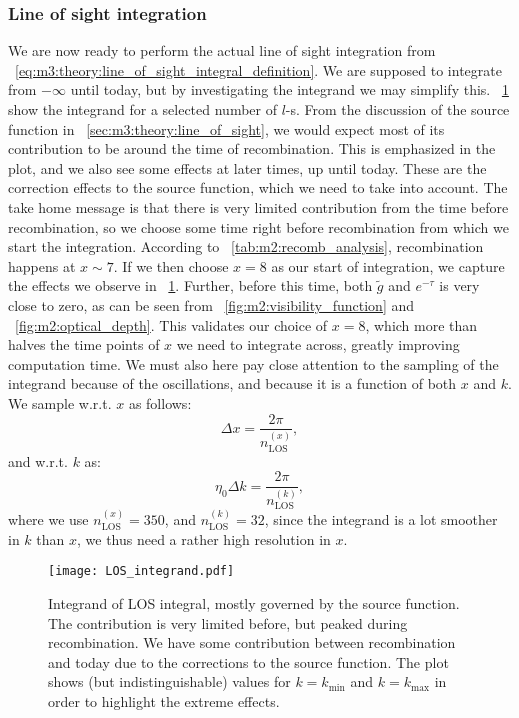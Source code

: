     \subsubsection{Line of sight integration}
        We are now ready to perform the actual line of sight integration from ~\cref{eq:m3:theory:line_of_sight_integral_definition}. We are supposed to integrate from $-\infty$ until today, but by investigating the integrand we may simplify this. ~\cref{fig:m4:LOS_integrand} show the integrand for a selected number of $l$-s. From the discussion of the source function in ~\cref{sec:m3:theory:line_of_sight}, we would expect most of its contribution to be around the time of recombination. This is emphasized in the plot, and we also see some effects at later times, up until today. These are the correction effects to the source function, which we need to take into account. The take home message is that there is very limited contribution from the time before recombination, so we choose some time right before recombination from which we start the integration. According to ~\cref{tab:m2:recomb_analysis}, recombination happens at $x\sim 7$. If we then choose $x=8$ as our start of integration, we capture the effects we observe in ~\cref{fig:m4:LOS_integrand}. Further, before this time, both $\tilde{g}$ and $e^{-\tau}$ is very close to zero, as can be seen from ~\cref{fig:m2:visibility_function} and ~\cref{fig:m2:optical_depth}. This validates our choice of $x=8$, which more than halves the time points of $x$ we need to integrate across, greatly improving computation time. We must also here pay close attention to the sampling of the integrand because of the oscillations, and because it is a function of both $x$ and $k$. We sample w.r.t. $x$ as follows:
        \begin{equation}
            \Delta x = \frac{2\pi}{n_\mathrm{LOS}^{(x)}},
        \end{equation}
        and w.r.t. $k$ as:
        \begin{equation}
            \eta_0\Delta k = \frac{2\pi}{n_\mathrm{LOS}^{(k)}},
        \end{equation}
        where we use $n_\mathrm{LOS}^{(x)}=350$, and $n_\mathrm{LOS}^{(k)}=32$, since the integrand is a lot smoother in $k$ than $x$, we thus need a rather high resolution in $x$. 

        \begin{figure}
            \texttt{[image: LOS\_integrand.pdf]}
            \caption{Integrand of LOS integral, mostly governed by the source function. The contribution is very limited before, but peaked during recombination. We have some contribution between recombination and today due to the corrections to the source function. The plot shows (but indistinguishable) values for $k=k_\mathrm{min}$ and $k=k_\mathrm{max}$ in order to highlight the extreme effects.}
            \label{fig:m4:LOS_integrand}
        \end{figure}

